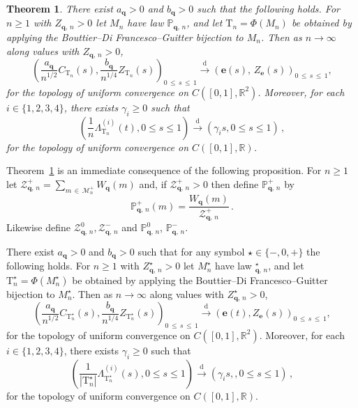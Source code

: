 \documentclass[10pt]{amsart}
\newtheorem{theo}{Theorem}[section]
\theoremstyle{definition}\newtheorem{defi}[theo]{Definition}\newtheorem{rema}[theo]{Remark}\newtheorem{exam}[theo]{Example}\newtheorem{exem}[theo]{Example}\newtheorem{nota}[theo]{Notation}
\providecommand{\R}{}
\renewcommand{\R}{\mathbb{R}}
\newcommand{\bbP}{\mathbb{P}}
\newcommand{\bfe}{\mathbf{e}}
\newcommand{\bfq}{\mathbf{q}}
\newcommand{\cM}{\mathcal{M}}
\newcommand{\cZ}{\mathcal{Z}}
\newcommand{\rT}{\mathrm{T}}
\newcommand{\convdist}{\ensuremath{\stackrel{\mathrm{d}}{\rightarrow}}}
\begin{document}
\begin{theo}\label{thm:convSnake}
There exist $a_{\bfq}>0$ and $b_{\bfq}>0$ such that the following holds. For $n \ge 1$ with $Z_{\bfq,\,n} >0$ let $M_n$ have law $\bbP_{\bfq,\,n}$, and let $\rT_n=\Phi(M_n)$ be obtained by applying the Bouttier--Di Francesco--Guitter bijection to $M_n$. Then as $n \to \infty$ along values with $Z_{\bfq,\,n} >0$,
\[
\left(\frac{a_{\bfq}}{n^{1/2}}C_{\rT_n}(s),\frac{b_{\bfq}}{n^{1/4}}Z_{\rT_n}(s)\right)_{0\,\leq\,s\,\leq\,1} \convdist \left(\bfe(s),\,Z_{\bfe}(s)\right)_{0\,\leq\,s\,\leq\,1},
\]
for the topology of uniform convergence on $C([0,1],\R^2)$. Moreover, for each $i\in\{1,2,3,4\}$, there exists $\gamma_i\geq 0$ such that
\[
\left(\frac{1}{n}\Lambda^{(i)}_{\rT_n}(t),0\leq s\leq 1\right)\convdist \left(\gamma_is,0\leq s\leq 1\right)\,,
\]
for the topology of uniform convergence on $C([0,1],\R)$.
\end{theo}

Theorem~\ref{thm:convSnake} is an immediate consequence of the following proposition. For $n \ge 1$ let $\cZ_{\bfq,\,n}^+ = \sum_{m\,\in\,\cM_n^+} W_{\bfq}(m)$ and, if $\cZ_{\bfq,\,n}^+>0$ then define $\bbP_{\bfq,\,n}^+$ by
\[
\bbP_{\bfq,\,n}^+(m) = \frac{W_{\bfq}(m)}{\cZ_{\bfq,\,n}^+}\,.
\]
Likewise define $\cZ_{\bfq,\,n}^0,\cZ_{\bfq,\,n}^-$ and $\bbP_{\bfq,\,n}^0$, $\bbP_{\bfq,\,n}^-$.

\begin{prop}\label{prop:convSnake}
There exist $a_{\bfq}>0$ and $b_{\bfq}>0$ such that for any symbol $\star \in \{-,0,+\}$ the following holds. For $n \ge 1$ with $Z_{\bfq,\,n}^\star >0$ let $M_n^\star$ have law $_{\bfq,\,n}^\star$, and let $\rT_n^\star=\Phi(M_n^\star)$ be obtained by applying the Bouttier--Di Francesco--Guitter bijection to $M_n^\star$. Then as $n \to \infty$ along values with $Z_{\bfq,\,n}^\star >0$,
\[
\left(\frac{a_{\bfq}}{n^{1/2}}C_{\rT_n^\star}(s),\frac{b_{\bfq}}{n^{1/4}}Z_{\rT_n^\star}(s)\right)_{0\,\leq\,s \,\leq\,1} \convdist (\bfe(t),Z_{\bfe}(s))_{0\,\leq\,s\,\leq \,1},
\]
for the topology of uniform convergence on $C([0,1],\R^2)$. Moreover, for each $i\in\{1,2,3,4\}$, there exists $\gamma_i\geq 0$ such that
\[
\left(\frac{1}{\left|\rT^\star_n\right|}\Lambda^{(i)}_{\rT^\star_n}(s),0\leq s\leq 1\right)\convdist\left(\gamma_is,,0\leq s\leq 1\right)\,,
\]
for the topology of uniform convergence on $C([0,1],\R)$.
\end{prop}
\end{document}
